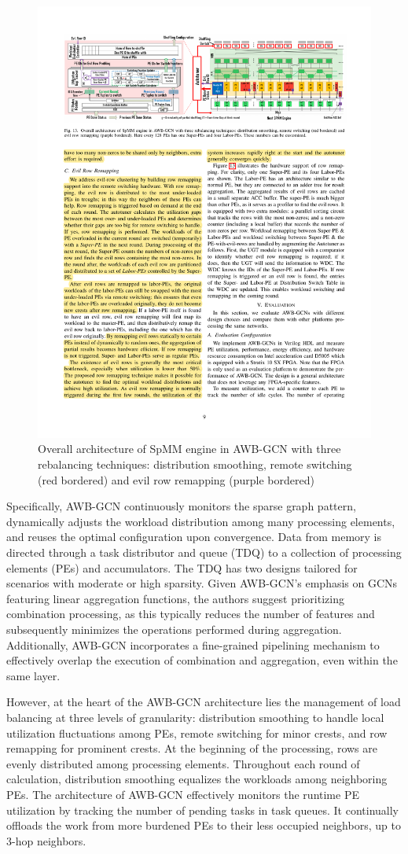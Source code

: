 \begin{figure}[t]
    \centering
    \includegraphics[height=0.3\textwidth]{Images/AWB_GCN_SpMM_architecture}
    \caption[Overall architecture of SpMM engine in AWB-GCN~\cite{DBLP:journals/corr/abs-1908-10834}]{Overall architecture of SpMM engine in AWB-GCN with three rebalancing techniques: distribution smoothing, remote switching (red bordered) and evil row remapping (purple bordered)~\cite{DBLP:journals/corr/abs-1908-10834}}
    \label{fig:awb_gcn_architecture}
\end{figure}

Specifically, AWB-GCN continuously monitors the sparse graph pattern, dynamically adjusts the workload distribution among many processing elements, and reuses the optimal configuration upon convergence.
Data from memory is directed through a task distributor and queue (TDQ) to a collection of processing elements (PEs) and accumulators.
The TDQ has two designs tailored for scenarios with moderate or high sparsity.
Given AWB-GCN's emphasis on GCNs featuring linear aggregation functions, the authors suggest prioritizing combination processing, as this typically reduces the number of features and subsequently minimizes the operations performed during aggregation.
Additionally, AWB-GCN incorporates a fine-grained pipelining mechanism to effectively overlap the execution of combination and aggregation, even within the same layer.

However, at the heart of the AWB-GCN architecture lies the management of load balancing at three levels of granularity: distribution smoothing to handle local utilization fluctuations among PEs, remote switching for minor crests, and row remapping for prominent crests.
At the beginning of the processing, rows are evenly distributed among processing elements.
Throughout each round of calculation, distribution smoothing equalizes the workloads among neighboring PEs.
The architecture of AWB-GCN effectively monitors the runtime PE utilization by tracking the number of pending tasks in task queues.
It continually offloads the work from more burdened PEs to their less occupied neighbors, up to 3-hop neighbors.

